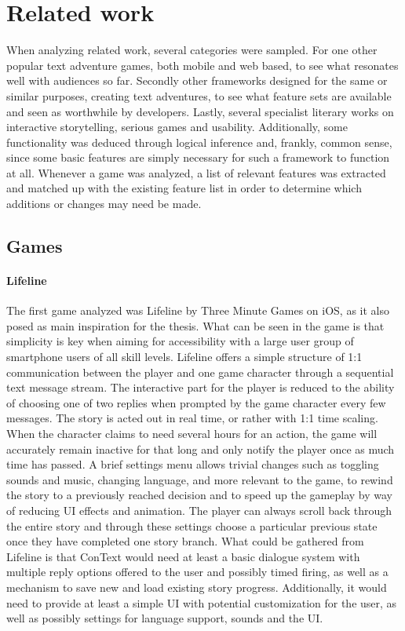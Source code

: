 \section{Related work}
When analyzing related work, several categories were sampled. For one other popular text adventure games, both mobile and web based, to see what resonates well with audiences so far. Secondly other frameworks designed for the same or similar purposes, creating text adventures, to see what feature sets are available and seen as worthwhile by developers. Lastly, several specialist literary works on interactive storytelling, serious games and usability. Additionally, some functionality was deduced through logical inference and, frankly, common sense, since some basic features are simply necessary for such a framework to function at all.
Whenever a game was analyzed, a list of relevant features was extracted and matched up with the existing feature list in order to determine which additions or changes may need be made.

\subsection{Games}

\paragraph{Lifeline} 
The first game analyzed was Lifeline by Three Minute Games on iOS, as it also posed as main inspiration for the thesis. What can be seen in the game is that simplicity is key when aiming for accessibility with a large user group of smartphone users of all skill levels. Lifeline offers a simple structure of 1:1 communication between the player and one game character through a sequential text message stream. The interactive part for the player is reduced to the ability of choosing one of two replies when prompted by the game character every few messages. 
The story is acted out in real time, or rather with 1:1 time scaling. When the character claims to need several hours for an action, the game will accurately remain inactive for that long and only notify the player once as much time has passed.
A brief settings menu allows trivial changes such as toggling sounds and music, changing language, and more relevant to the game, to rewind the story to a previously reached decision and to speed up the gameplay by way of reducing UI effects and animation. 
The player can always scroll back through the entire story and through these settings choose a particular previous state once they have completed one story branch. 
What could be gathered from Lifeline is that ConText would need at least a basic dialogue system with multiple reply options offered to the user and possibly timed firing, as well as a mechanism to save new and load existing story progress. Additionally, it would need to provide at least a simple UI with potential customization for the user, as well as possibly settings for language support, sounds and the UI. \cite{LIFE}

